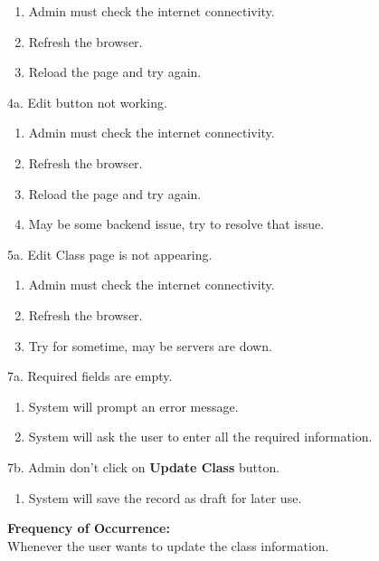 \documentclass[12pt]{article}
\begin{document}
\begin{enumerate}
\item Admin must check the internet connectivity.
\item Refresh the browser.
\item Reload the page and try again.
\end{enumerate}
4a. Edit button not working.
\begin{enumerate}
\item Admin must check the internet connectivity.
\item Refresh the browser.
\item Reload the page and try again.
\item May be some backend issue, try to resolve that issue.
\end{enumerate}
5a. Edit Class page is not appearing.
\begin{enumerate}
\item Admin must check the internet connectivity.
\item Refresh the browser.
\item Try for sometime, may be servers are down.
\end{enumerate}
7a. Required fields are empty.
\begin{enumerate}
\item System will prompt an error message.
\item System will ask the user to enter all the required information.
\end{enumerate}
7b. Admin don't click on \textbf{Update Class} button.
\begin{enumerate}
\item System will save the record as draft for later use.
\end{enumerate}
\textbf{Frequency of Occurrence:}\\
Whenever the user wants to update the class information.
\end{document}
